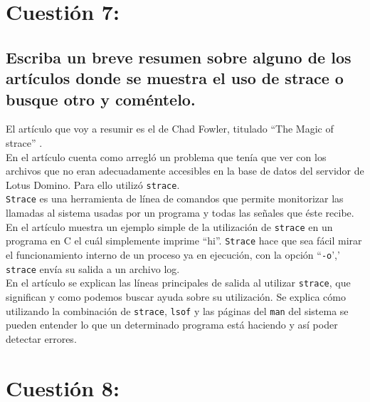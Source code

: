 
\section{Cuestión 7:}

\subsection{Escriba un breve resumen sobre alguno de los artículos donde se muestra el uso de strace o busque otro y coméntelo.}

El artículo que voy a resumir es el de Chad Fowler, titulado ``The Magic of strace'' \cite{straceArticulo}.\\

En el artículo cuenta como arregló un problema que tenía que ver con los archivos que no eran adecuadamente accesibles en la base de datos del servidor de Lotus Domino. Para ello utilizó \texttt{strace}. \\

\texttt{Strace} es una herramienta de línea de comandos que permite monitorizar las llamadas al sistema usadas por un programa y todas las señales que éste recibe. En el artículo muestra un ejemplo simple de la utilización de \texttt{strace} en un programa en C el cuál simplemente imprime ``hi''. \texttt{Strace} hace que sea fácil mirar el funcionamiento interno de un proceso ya en ejecución, con la opción ``\texttt{-o}',' \texttt{strace} envía su salida a un archivo log.\\

En el artículo se explican las líneas principales de salida al utilizar \texttt{strace}, que significan y como podemos buscar ayuda sobre su utilización. Se explica cómo utilizando la combinación de \texttt{strace}, \texttt{lsof} y las páginas del \texttt{man} del sistema se pueden entender lo que un determinado programa está haciendo y así poder detectar errores.





\section{Cuestión 8:}

